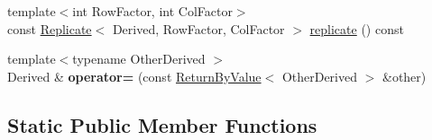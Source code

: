 \begin{DoxyCompactItemize}
\item 
{\footnotesize template$<$int Row\+Factor, int Col\+Factor$>$ }\\const \mbox{\hyperlink{class_eigen_1_1_replicate}{Replicate}}$<$ Derived, Row\+Factor, Col\+Factor $>$ \mbox{\hyperlink{class_eigen_1_1_dense_base_a8a4236585a41142538e80370f466b590}{replicate}} () const
\item 
\mbox{\label{class_eigen_1_1_dense_base_aa2875fc2c5e22a032cca855402b47f82}} 
{\footnotesize template$<$typename Other\+Derived $>$ }\\Derived \& {\bfseries operator=} (const \mbox{\hyperlink{class_eigen_1_1_return_by_value}{Return\+By\+Value}}$<$ Other\+Derived $>$ \&other)
\end{DoxyCompactItemize}
\subsection*{Static Public Member Functions}
